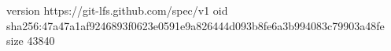 version https://git-lfs.github.com/spec/v1
oid sha256:47a47a1af9246893f0623e0591e9a826444d093b8fe6a3b994083c79903a48fe
size 43840
